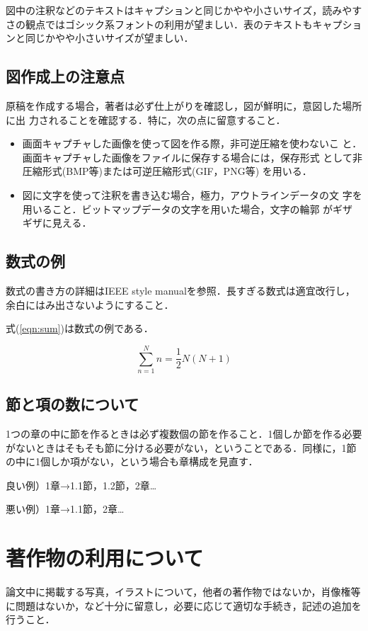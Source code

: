 \documentclass[twoside]{wiss}
\begin{document}
図中の注釈などのテキストはキャプションと同じかやや小さいサイズ，読みやすさの観点ではゴシック系フォントの利用が望ましい．表のテキストもキャプションと同じかやや小さいサイズが望ましい．

\subsection{図作成上の注意点}
原稿を作成する場合，著者は必ず仕上がりを確認し，図が鮮明に，意図した場所に出
力されることを確認する．特に，次の点に留意すること．
\begin{itemize}

 \item 画面キャプチャした画像を使って図を作る際，非可逆圧縮を使わないこ
       と．画面キャプチャした画像をファイルに保存する場合には，保存形式
       として非圧縮形式(BMP等)または可逆圧縮形式(GIF，PNG等) を用いる．

 \item 図に文字を使って注釈を書き込む場合，極力，アウトラインデータの文
       字を用いること．ビットマップデータの文字を用いた場合，文字の輪郭
       がギザギザに見える．
\end{itemize}

\subsection{数式の例}
数式の書き方の詳細はIEEE style manual\cite{IEEE2014}を参照．長すぎる数式は適宜改行し，余白にはみ出さないようにすること．

式(\ref{eqn:sum})は数式の例である．

\begin{equation}
\sum^{N}_{n=1}n = \frac{1}{2}N(N+1)
\label{eqn:sum}
\end{equation}

\subsection{節と項の数について}
1つの章の中に節を作るときは必ず複数個の節を作ること．1個しか節を作る必要がないときはそもそも節に分ける必要がない，ということである．同様に，1節の中に1個しか項がない，という場合も章構成を見直す．

良い例）1章→1.1節，1.2節，2章…

悪い例）1章→1.1節，2章…

\section{著作物の利用について}
論文中に掲載する写真，イラストについて，他者の著作物ではないか，肖像権等に問題はないか，など十分に留意し，必要に応じて適切な手続き，記述の追加を行うこと．
\end{document}
